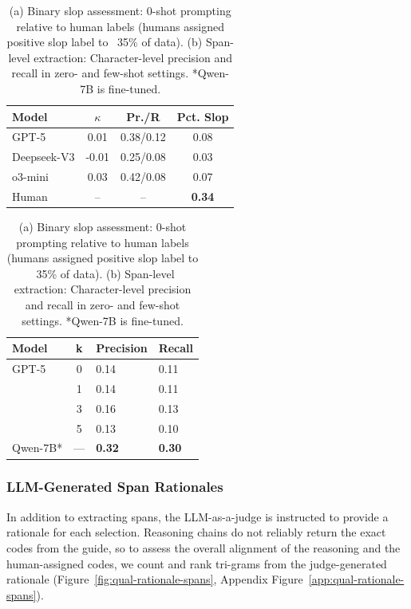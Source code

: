\documentclass{article} %
\begin{document}
\begin{table}[t]
\centering
\small
\begin{minipage}[b]{0.48\textwidth}
\centering
\begin{tabular}{lccc}
\toprule
\textbf{Model} & \textbf{$\kappa$} & \textbf{Pr./R} & \textbf{Pct. Slop}\\
\midrule
GPT-5 & 0.01 & 0.38/0.12 & 0.08\\
Deepseek-V3 & -0.01 & 0.25/0.08 & 0.03\\
o3-mini & 0.03 & 0.42/0.08 & 0.07\\ 

\midrule
Human & -- & -- & \textbf{0.34} \\
\bottomrule
\end{tabular}
\subcaption{}
\label{tab:binary-assessment}
\end{minipage}
\hfill
\begin{minipage}[b]{0.48\textwidth}
\centering
\begin{tabular}{lcll}
\toprule
\textbf{Model} & \textbf{k} & \textbf{Precision} & \textbf{Recall}\\
\midrule
GPT-5 & 0 & 0.14 & 0.11\\
& 1 & 0.14 & 0.11\\
& 3 & 0.16 & 0.13\\
& 5 & 0.13 & 0.10\\
\midrule
Qwen-7B* & --- & \textbf{0.32} & \textbf{0.30}\\
\bottomrule
\end{tabular}
\subcaption{}
\label{tab:span-extraction}
\end{minipage}
\caption{(a) Binary slop assessment: 0-shot prompting relative to human labels (humans assigned positive slop label to ~35\% of data). (b) Span-level extraction: Character-level precision and recall in zero- and few-shot settings. *Qwen-7B is fine-tuned.}
\label{tab:combined-assessment}
\end{table}

\subsubsection{LLM-Generated Span Rationales}
\label{app:qualitative_domain_assessment}
In addition to extracting spans, the LLM-as-a-judge is instructed to provide a rationale for each selection. 
Reasoning chains do not reliably return the exact codes from the guide, so to assess the overall alignment of the reasoning and the human-assigned codes, we count and rank tri-grams from the judge-generated rationale (Figure~\ref{fig:qual-rationale-spans}, Appendix Figure~\ref{app:qual-rationale-spans}).
\end{document}
